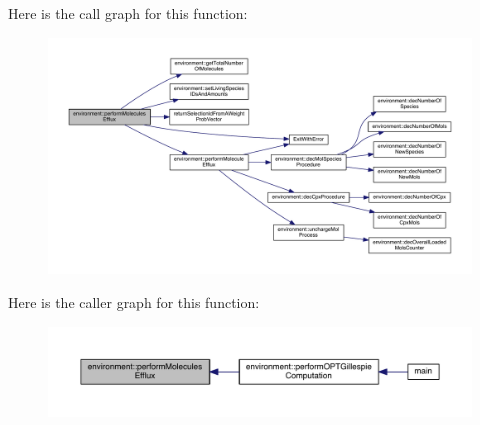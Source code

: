 Here is the call graph for this function\-:\nopagebreak
\begin{figure}[H]
\begin{center}
\leavevmode
\includegraphics[width=350pt]{a00014_acbbcdb4c77231e9ffa4c169e0caa0d0c_cgraph}
\end{center}
\end{figure}




Here is the caller graph for this function\-:\nopagebreak
\begin{figure}[H]
\begin{center}
\leavevmode
\includegraphics[width=350pt]{a00014_acbbcdb4c77231e9ffa4c169e0caa0d0c_icgraph}
\end{center}
\end{figure}


